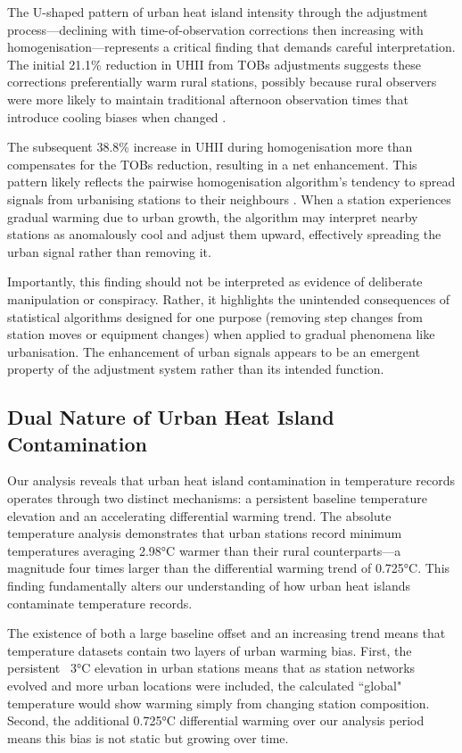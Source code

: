 \documentclass[11pt, a4paper]{article}
\begin{document}
The U-shaped pattern of urban heat island intensity through the adjustment process—declining with time-of-observation corrections then increasing with homogenisation—represents a critical finding that demands careful interpretation. The initial 21.1\% reduction in UHII from TOBs adjustments suggests these corrections preferentially warm rural stations, possibly because rural observers were more likely to maintain traditional afternoon observation times that introduce cooling biases when changed \parencite{vose2003tobs}.

The subsequent 38.8\% increase in UHII during homogenisation more than compensates for the TOBs reduction, resulting in a net enhancement. This pattern likely reflects the pairwise homogenisation algorithm's tendency to spread signals from urbanising stations to their neighbours \parencite{menne2009homogenization}. When a station experiences gradual warming due to urban growth, the algorithm may interpret nearby stations as anomalously cool and adjust them upward, effectively spreading the urban signal rather than removing it.

Importantly, this finding should not be interpreted as evidence of deliberate manipulation or conspiracy. Rather, it highlights the unintended consequences of statistical algorithms designed for one purpose (removing step changes from station moves or equipment changes) when applied to gradual phenomena like urbanisation. The enhancement of urban signals appears to be an emergent property of the adjustment system rather than its intended function.

\subsection{Dual Nature of Urban Heat Island Contamination}

Our analysis reveals that urban heat island contamination in temperature records operates through two distinct mechanisms: a persistent baseline temperature elevation and an accelerating differential warming trend. The absolute temperature analysis demonstrates that urban stations record minimum temperatures averaging 2.98°C warmer than their rural counterparts—a magnitude four times larger than the differential warming trend of 0.725°C. This finding fundamentally alters our understanding of how urban heat islands contaminate temperature records.

The existence of both a large baseline offset and an increasing trend means that temperature datasets contain two layers of urban warming bias. First, the persistent ~3°C elevation in urban stations means that as station networks evolved and more urban locations were included, the calculated ``global" temperature would show warming simply from changing station composition. Second, the additional 0.725°C differential warming over our analysis period means this bias is not static but growing over time.
\end{document}
